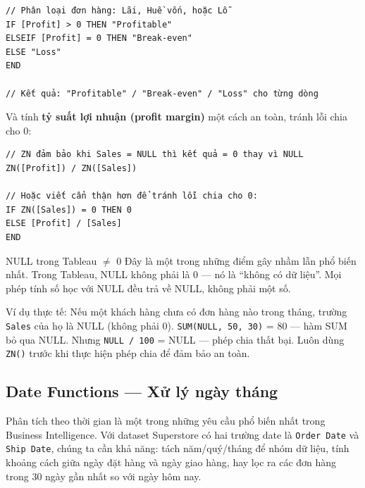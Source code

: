 \documentclass[12pt]{article}
\begin{document}
\begin{aivncodebox}[]
\begin{lstlisting}
// Phân loại đơn hàng: Lãi, Huề vốn, hoặc Lỗ
IF [Profit] > 0 THEN "Profitable"
ELSEIF [Profit] = 0 THEN "Break-even"
ELSE "Loss"
END

// Kết quả: "Profitable" / "Break-even" / "Loss" cho từng dòng
\end{lstlisting}
\end{aivncodebox}

\noindent Và tính \textbf{tỷ suất lợi nhuận (profit margin)} một cách an toàn, tránh lỗi chia cho 0:

\begin{aivncodebox}[]
\begin{lstlisting}
// ZN đảm bảo khi Sales = NULL thì kết quả = 0 thay vì NULL
ZN([Profit]) / ZN([Sales])

// Hoặc viết cẩn thận hơn để tránh lỗi chia cho 0:
IF ZN([Sales]) = 0 THEN 0
ELSE [Profit] / [Sales]
END
\end{lstlisting}
\end{aivncodebox}

\begin{warningbox}{NULL trong Tableau $\neq$ 0}
Đây là một trong những điểm gây nhầm lẫn phổ biến nhất. Trong Tableau, NULL không phải là 0 --- nó là ``không có dữ liệu''. Mọi phép tính số học với NULL đều trả về NULL, không phải một số.

\noindent Ví dụ thực tế: Nếu một khách hàng chưa có đơn hàng nào trong tháng, trường \texttt{Sales} của họ là NULL (không phải 0). \texttt{SUM(NULL, 50, 30)} = 80 --- hàm SUM bỏ qua NULL. Nhưng \texttt{NULL / 100} = NULL --- phép chia thất bại. Luôn dùng \texttt{ZN()} trước khi thực hiện phép chia để đảm bảo an toàn.
\end{warningbox}

\subsection{Date Functions --- Xử lý ngày tháng}

\noindent Phân tích theo thời gian là một trong những yêu cầu phổ biến nhất trong Business Intelligence. Với dataset Superstore có hai trường date là \texttt{Order Date} và \texttt{Ship Date}, chúng ta cần khả năng: tách năm/quý/tháng để nhóm dữ liệu, tính khoảng cách giữa ngày đặt hàng và ngày giao hàng, hay lọc ra các đơn hàng trong 30 ngày gần nhất so với ngày hôm nay.
\end{document}
